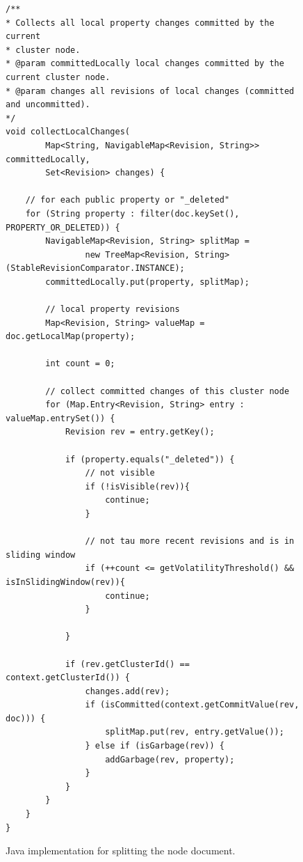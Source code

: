 \documentclass[abstracton,12pt]{scrreprt}
\begin{document}
\begin{figure}[h]
    \begin{framed}
        \begin{scriptsize}
            \begin{verbatim}
/**
* Collects all local property changes committed by the current
* cluster node.
* @param committedLocally local changes committed by the current cluster node.
* @param changes all revisions of local changes (committed and uncommitted).
*/
void collectLocalChanges(
        Map<String, NavigableMap<Revision, String>> committedLocally,
        Set<Revision> changes) {

    // for each public property or "_deleted"
    for (String property : filter(doc.keySet(), PROPERTY_OR_DELETED)) {
        NavigableMap<Revision, String> splitMap =
                new TreeMap<Revision, String>(StableRevisionComparator.INSTANCE);
        committedLocally.put(property, splitMap);

        // local property revisions
        Map<Revision, String> valueMap = doc.getLocalMap(property);

        int count = 0;

        // collect committed changes of this cluster node
        for (Map.Entry<Revision, String> entry : valueMap.entrySet()) {
            Revision rev = entry.getKey();

            if (property.equals("_deleted")) {
                // not visible
                if (!isVisible(rev)){
                    continue;
                }

                // not tau more recent revisions and is in sliding window
                if (++count <= getVolatilityThreshold() && isInSlidingWindow(rev)){
                    continue;
                }

            }

            if (rev.getClusterId() == context.getClusterId()) {
                changes.add(rev);
                if (isCommitted(context.getCommitValue(rev, doc))) {
                    splitMap.put(rev, entry.getValue());
                } else if (isGarbage(rev)) {
                    addGarbage(rev, property);
                }
            }
        }
    }
}
            \end{verbatim}
        \end{scriptsize}
    \end{framed}
    \caption{Java implementation for splitting the node document.}
    \label{algo:split_document}
\end{figure}
\end{document}
